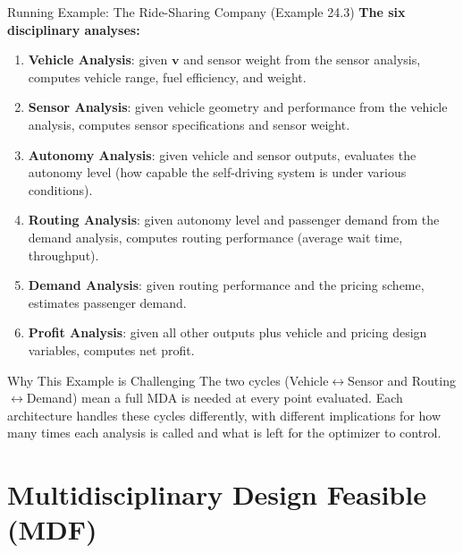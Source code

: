 \documentclass[aspectratio=169,10pt]{beamer}
\begin{document}
\begin{frame}[allowframebreaks]{Running Example: The Ride-Sharing Company (Example 24.3)}
  \textbf{The six disciplinary analyses:}
  \begin{enumerate}
    \item \textbf{Vehicle Analysis}: given $\mathbf{v}$ and sensor weight
          from the sensor analysis, computes vehicle range, fuel efficiency,
          and weight.
    \item \textbf{Sensor Analysis}: given vehicle geometry and performance
          from the vehicle analysis, computes sensor specifications and
          sensor weight.
    \item \textbf{Autonomy Analysis}: given vehicle and sensor outputs,
          evaluates the autonomy level (how capable the self-driving system
          is under various conditions).
    \item \textbf{Routing Analysis}: given autonomy level and passenger
          demand from the demand analysis, computes routing performance
          (average wait time, throughput).
    \item \textbf{Demand Analysis}: given routing performance and the
          pricing scheme, estimates passenger demand.
    \item \textbf{Profit Analysis}: given all other outputs plus vehicle and
          pricing design variables, computes net profit.
  \end{enumerate}

  \begin{alertblock}{Why This Example is Challenging}
    The two cycles (Vehicle$\leftrightarrow$Sensor and
    Routing$\leftrightarrow$Demand) mean a full MDA is needed at every
    point evaluated.  Each architecture handles these cycles differently,
    with different implications for how many times each analysis is called
    and what is left for the optimizer to control.
  \end{alertblock}

\end{frame}

\section{Multidisciplinary Design Feasible (MDF)}
\end{document}
